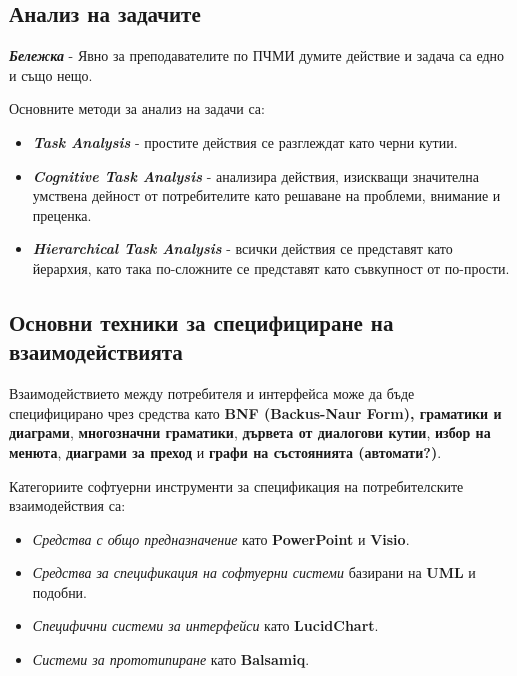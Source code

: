 \documentclass[fleqn,12pt]{article}
\begin{document}
\subsection{Анализ на задачите}

\textbf{\textit{Бележка}} - Явно за преподавателите по ПЧМИ думите действие и задача са едно и също нещо.

Основните методи за анализ на задачи са:
\begin{itemize}
    \item \textbf{\textit{Task Analysis}} - простите действия се разглеждат като черни кутии.
    \item \textbf{\textit{Cognitive Task Analysis}} - анализира действия, изискващи значителна умствена дейност от потребителите като решаване на проблеми, внимание и преценка.
    \item \textbf{\textit{Hierarchical Task Analysis}} - всички действия се представят като йерархия, като така по-сложните се представят като съвкупност от по-прости.
\end{itemize}

\subsection{Основни техники за специфициране на взаимодействията}

Взаимодействието между потребителя и интерфейса може да бъде специфицирано чрез средства като \textbf{BNF (Backus-Naur Form), граматики и диаграми}, \textbf{многозначни граматики}, \textbf{дървета от диалогови кутии}, \textbf{избор на менюта}, \textbf{диаграми за преход} и \textbf{графи на състоянията (автомати?)}.

Категориите софтуерни инструменти за спецификация на потребителските взаимодействия са:
\begin{itemize}
    \item \textit{Средства с общо предназначение} като \textbf{PowerPoint} и \textbf{Visio}.
    \item \textit{Средства за спецификация на софтуерни системи} базирани на \textbf{UML} и подобни.
    \item \textit{Специфични системи за интерфейси} като \textbf{LucidChart}.
    \item \textit{Системи за прототипиране} като \textbf{Balsamiq}.
\end{itemize}

\end{document}
